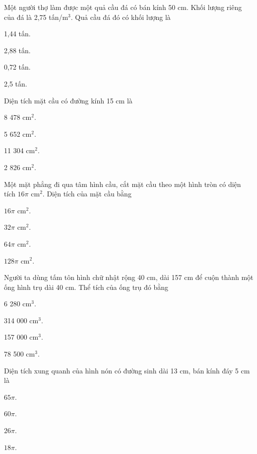\documentclass[%
    fontsize=12pt,%
    chapterprefix=false,%
    open=right,%
    twoside=false,%
    numbers=noenddot,%
    headings=optiontohead,%
    final,%
    DIV=15,%
    parskip=half %
]{scrbook}
\begin{document}
\begin{tracnghiem}
\item Một người thợ làm được một quả cầu đá có bán kính 50 cm. Khối lượng riêng của đá là 2,75 tấn/m$^3$. Quả cầu đá đó có khối lượng là
\begin{options}
  \item 1,44 tấn.
  \item 2,88 tấn.
  \item 0,72 tấn.
  \item 2,5 tấn.
\end{options}

\item Diện tích mặt cầu có đường kính 15 cm là
\begin{options}
  \item 8 478 cm$^2$.
  \item 5 652 cm$^2$.
  \item 11 304 cm$^2$.
  \item 2 826 cm$^2$.
\end{options}

\item Một mặt phẳng đi qua tâm hình cầu, cắt mặt cầu theo một hình tròn có diện tích $ 16\pi $ cm$^2$. Diện tích của mặt cầu bằng
\begin{options}
  \item $ 16\pi $ cm$^2$.
  \item $ 32\pi $ cm$^2$.
  \item $ 64\pi $ cm$^2$.
  \item $ 128\pi $ cm$^2$.
\end{options}

\item Người ta dùng tấm tôn hình chữ nhật rộng 40 cm, dài 157 cm để cuộn thành một ống hình trụ dài 40 cm. Thể tích của ống trụ đó bằng
\begin{options}
  \item 6 280 cm$^3$.
  \item 314 000 cm$^3$.
  \item 157 000 cm$^3$.
  \item 78 500 cm$^3$.
\end{options}

\item Diện tích xung quanh của hình nón có đường sinh dài 13 cm, bán kính đáy 5 cm là
\begin{options}
  \item $ 65\pi $.
  \item $ 60\pi $.
  \item $ 26\pi $.
  \item $ 18\pi $.
\end{options}


\end{tracnghiem}
\end{document}

